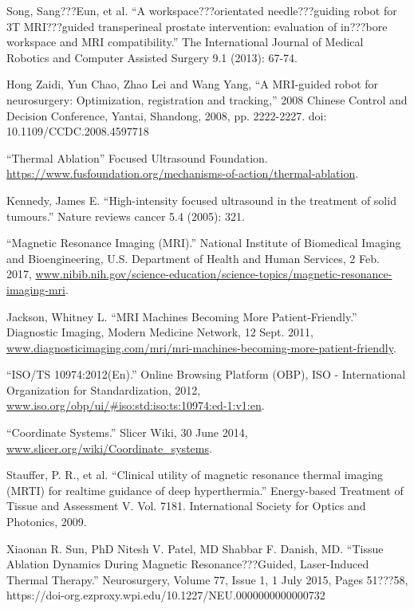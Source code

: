 \documentclass[12pt]{report}
\begin{document}
\begin{thebibliography}{99}
 Song, Sang???Eun, et al. ``A workspace???orientated needle???guiding robot for 3T MRI???guided transperineal prostate intervention: evaluation of in???bore workspace and MRI compatibility.'' The International Journal of Medical Robotics and Computer Assisted Surgery 9.1 (2013): 67-74.

 Hong Zaidi, Yun Chao, Zhao Lei and Wang Yang, ``A MRI-guided robot for neurosurgery: Optimization, registration and tracking,'' 2008 Chinese Control and Decision Conference, Yantai, Shandong, 2008, pp. 2222-2227. doi: 10.1109/CCDC.2008.4597718

 ``Thermal Ablation'' Focused Ultrasound Foundation. \url{https://www.fusfoundation.org/mechanisms-of-action/thermal-ablation}.

 Kennedy, James E. ``High-intensity focused ultrasound in the treatment of solid tumours.'' Nature reviews cancer 5.4 (2005): 321.

 ``Magnetic Resonance Imaging (MRI).'' National Institute of Biomedical Imaging and Bioengineering, U.S. Department of Health and Human Services, 2 Feb. 2017, \url{www.nibib.nih.gov/science-education/science-topics/magnetic-resonance-imaging-mri}.

 Jackson, Whitney L. ``MRI Machines Becoming More Patient-Friendly.'' Diagnostic Imaging, Modern Medicine Network, 12 Sept. 2011, \url{www.diagnosticimaging.com/mri/mri-machines-becoming-more-patient-friendly}.

 ``ISO/TS 10974:2012(En).'' Online Browsing Platform (OBP), ISO - International Organization for Standardization, 2012, \url{www.iso.org/obp/ui/#iso:std:iso:ts:10974:ed-1:v1:en}.

 ``Coordinate Systems.'' Slicer Wiki, 30 June 2014, \url{www.slicer.org/wiki/Coordinate_systems}.

 Stauffer, P. R., et al. ``Clinical utility of magnetic resonance thermal imaging (MRTI) for realtime guidance of deep hyperthermia.'' Energy-based Treatment of Tissue and Assessment V. Vol. 7181. International Society for Optics and Photonics, 2009.

 Xiaonan R. Sun, PhD  Nitesh V. Patel, MD  Shabbar F. Danish, MD. ``Tissue Ablation Dynamics During Magnetic Resonance???Guided, Laser-Induced Thermal Therapy.'' Neurosurgery, Volume 77, Issue 1, 1 July 2015, Pages 51???58, https://doi-org.ezproxy.wpi.edu/10.1227/NEU.0000000000000732


\end{thebibliography}
\end{document}

